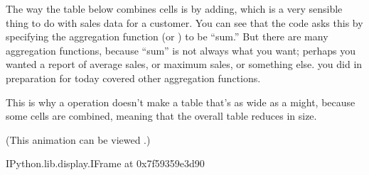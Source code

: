 \documentclass[letterpaper,10pt,english]{jupyterBook}
\begin{document}
\sphinxAtStartPar
The way the table below combines cells is by adding, which is a very sensible thing to do with sales data for a customer.  You can see that the code asks this by specifying the aggregation function (or ) to be “sum.”  But there are many aggregation functions, because “sum” is not always what you want; perhaps you wanted a report of average sales, or maximum sales, or something else.   you did in preparation for today covered other aggregation functions.

\sphinxAtStartPar
This is why a  operation doesn’t make a table that’s as wide as a  might, because some cells are combined, meaning that the overall table reduces in size.

\sphinxAtStartPar
(This animation can be viewed .)

\begin{sphinxVerbatim}[commandchars=\\\{\}]
\PYGZlt{}IPython.lib.display.IFrame at 0x7f59359e3d90\PYGZgt{}
\end{sphinxVerbatim}
\end{document}
